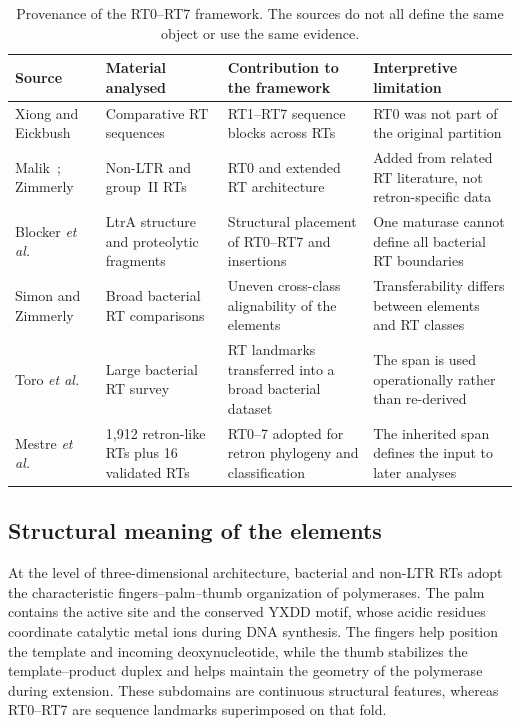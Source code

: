 \begin{table}[ht]
\centering
\scriptsize
\setlength{\tabcolsep}{3.5pt}
\begin{tabularx}{\textwidth}{@{}p{2.4cm}p{2.8cm}X p{3.0cm}@{}}
\toprule
\textbf{Source} & \textbf{Material analysed} & \textbf{Contribution to the framework} & \textbf{Interpretive limitation}\\
\midrule
Xiong and Eickbush~\cite{xiong1990} & Comparative RT sequences & RT1--RT7 sequence blocks across RTs & RT0 was not part of the original partition\\
Malik~\cite{malik1999}; Zimmerly~\cite{zimmerly2001} & Non-LTR and group~II RTs & RT0 and extended RT architecture & Added from related RT literature, not retron-specific data\\
Blocker \textit{et al.}~\cite{blocker2005} & LtrA structure and proteolytic fragments & Structural placement of RT0--RT7 and insertions & One maturase cannot define all bacterial RT boundaries\\
Simon and Zimmerly~\cite{simon2008} & Broad bacterial RT comparisons & Uneven cross-class alignability of the elements & Transferability differs between elements and RT classes\\
Toro \textit{et al.}~\cite{toro2019} & Large bacterial RT survey & RT landmarks transferred into a broad bacterial dataset & The span is used operationally rather than re-derived\\
Mestre \textit{et al.}~\cite{mestre2020} & 1,912 retron-like RTs plus 16 validated RTs & RT0--7 adopted for retron phylogeny and classification & The inherited span defines the input to later analyses\\
\bottomrule
\end{tabularx}
\caption[Provenance of the RT0--RT7 framework]{Provenance of the RT0--RT7 framework. The sources do not all define the same object or use the same evidence.}
\label{tab:rt-sources-integrated}
\end{table}

\subsection{Structural meaning of the elements}

At the level of three-dimensional architecture, bacterial and non-LTR RTs
adopt the characteristic fingers--palm--thumb organization of polymerases.
The palm contains the active site and the conserved YXDD motif, whose acidic
residues coordinate catalytic metal ions during DNA synthesis. The fingers
help position the template and incoming deoxynucleotide, while the thumb
stabilizes the template--product duplex and helps maintain the geometry of the
polymerase during extension. These subdomains are continuous structural
features, whereas RT0--RT7 are sequence landmarks superimposed on that fold.

